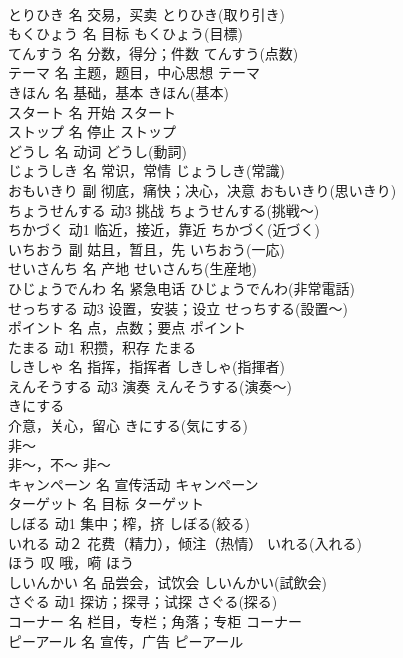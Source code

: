 \documentclass[8pt]{extreport}
\begin{document}
\begin{CJK}{UTF8}{min}
\\	とりひき	名	交易，买卖	とりひき(取り引き)	
\\	もくひょう	名	目标	もくひょう(目標)	
\\	てんすう	名	分数，得分；件数	てんすう(点数)	
\\	テーマ	名	主题，题目，中心思想	テーマ	
\\	きほん	名	基础，基本	きほん(基本)	
\\	スタート	名	开始	スタート	
\\	ストップ	名	停止	ストップ	
\\	どうし	名	动词	どうし(動詞)	
\\	じょうしき	名	常识，常情	じょうしき(常識)	
\\	おもいきり	副	彻底，痛快；决心，决意	おもいきり(思いきり)	
\\	ちょうせんする	动3	挑战	ちょうせんする(挑戦～)	
\\	ちかづく	动1	临近，接近，靠近	ちかづく(近づく)	
\\	いちおう	副	姑且，暂且，先	いちおう(一応)	
\\	せいさんち	名	产地	せいさんち(生産地)	
\\	ひじょうでんわ	名	紧急电话	ひじょうでんわ(非常電話)	
\\	せっちする	动3	设置，安装；设立	せっちする(設置～)	
\\	ポイント	名	点，点数；要点	ポイント	
\\	たまる	动1	积攒，积存	たまる	
\\	しきしゃ	名	指挥，指挥者	しきしゃ(指揮者)	
\\	えんそうする	动3	演奏	えんそうする(演奏～)	
\\	きにする	
\\	介意，关心，留心	きにする(気にする)	
\\	非～	
\\	非～，不～	非～	
\\	キャンペーン	名	宣传活动	キャンペーン	
\\	ターゲット	名	目标	ターゲット	
\\	しぼる	动1	集中；榨，挤	しぼる(絞る)	
\\	いれる	动２	花费（精力），倾注（热情）	いれる(入れる)	
\\	ほう	叹	哦，嗬	ほう	
\\	しいんかい	名	品尝会，试饮会	しいんかい(試飲会)	
\\	さぐる	动1	探访；探寻；试探	さぐる(探る)	
\\	コーナー	名	栏目，专栏；角落；专柜	コーナー	
\\	ピーアール	名	宣传，广告	ピーアール

\end{CJK}
\end{document}
